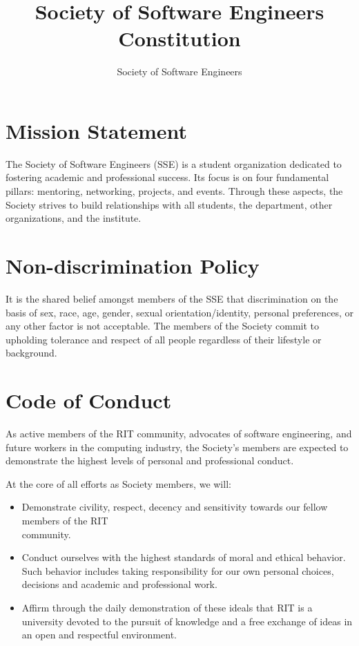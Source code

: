 \documentclass[american]{article}
\title{Society of Software Engineers Constitution}
\author{Society of Software Engineers}
\date{\datechanged}
\begin{document}
\maketitle

\tableofcontents

\section{Mission Statement}
The Society of Software Engineers (SSE) is a student organization dedicated to fostering academic and professional success. Its focus is on four fundamental pillars: mentoring, networking, projects, and events. Through these aspects, the Society strives to build relationships with all students, the department, other organizations, and the institute.

\section{Non-discrimination Policy}
It is the shared belief amongst members of the SSE that discrimination on the basis of sex, race, age, gender, sexual orientation/identity, personal preferences, or any other factor is not acceptable. The members of the Society commit to upholding tolerance and respect of all people regardless of their lifestyle or background.

\section{Code of Conduct}
As active members of the RIT community, advocates of software engineering, and future workers in the computing industry, the Society's members are expected to demonstrate the highest levels of personal and professional conduct.

At the core of all efforts as Society members, we will:

\begin{itemize}
\item Demonstrate civility, respect, decency and sensitivity towards our fellow members of the RIT \\ community.
\item Conduct ourselves with the highest standards of moral and ethical behavior. Such behavior includes taking responsibility for our own personal choices, decisions and academic and professional work.
\item Affirm through the daily demonstration of these ideals that RIT is a university devoted to the pursuit of knowledge and a free exchange of ideas in an open and respectful environment.
\end{itemize}
\end{document}
